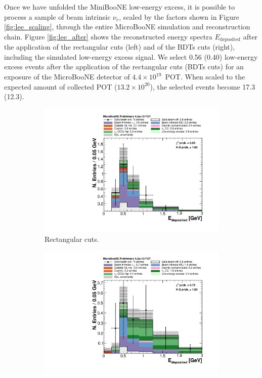 Once we have unfolded the MiniBooNE low-energy excess, it is possible to process a sample of beam intrinsic $\nu_e$, scaled by the factors shown in Figure \ref{fig:lee_scaling}, through the entire MicroBooNE simulation and reconstruction chain. Figure \ref{fig:lee_after} shows the reconstructed energy spectra $E_{\mathrm{deposited}}$ after the application of the rectangular cuts (left) and of the BDTs cuts (right), including the simulated low-energy excess signal. We select 0.56 (0.40) low-energy excess events after the application of the rectangular cuts (BDTs cuts) for an exposure of the MicroBooNE detector of $4.4\times10^{19}$~POT. When scaled to the expected amount of collected POT ($13.2\times10^{20}$), the selected events become 17.3 (12.3).

\begin{figure}[htbp]
  \begin{center}
    \begin{subfigure}{0.48\textwidth}
      \includegraphics[width=\linewidth]{figures/cuts_lee.pdf}
      \caption{Rectangular cuts.} 
    \end{subfigure}\hfill
    \begin{subfigure}{0.48\textwidth}
      \includegraphics[width=\linewidth]{figures/bdt_lee.pdf}

\end{subfigure}
\end{center}
\end{figure}
